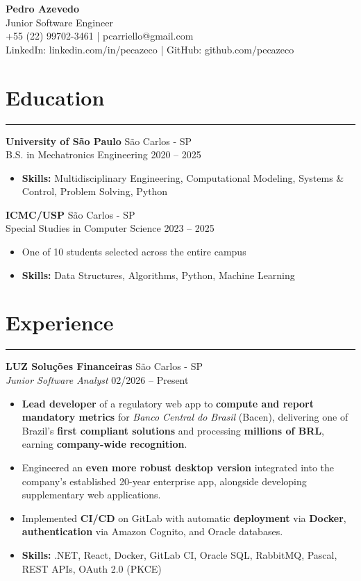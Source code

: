 \documentclass[10pt,a4paper]{article}
\begin{document}
\begin{center}
    {\huge \textbf{Pedro Azevedo}} \\
    Junior Software Engineer \\
    +55 (22) 99702-3461 \quad | \quad pcarriello@gmail.com \\
    LinkedIn: linkedin.com/in/pecazeco \quad | \quad GitHub: github.com/pecazeco
\end{center}

\section*{Education}
\hrule \vspace{2mm}
\textbf{University of São Paulo} \hfill São Carlos - SP \\
B.S. in Mechatronics Engineering \hfill 2020 -- 2025
\begin{itemize}[nosep]
    \item \textbf{Skills:} Multidisciplinary Engineering, Computational Modeling, Systems \& Control, Problem Solving, Python
\end{itemize}

\vspace{1mm}
\textbf{ICMC/USP} \hfill São Carlos - SP \\
Special Studies in Computer Science \hfill 2023 -- 2025
\begin{itemize}[nosep]
    \item One of 10 students selected across the entire campus
    \item \textbf{Skills:} Data Structures, Algorithms, Python, Machine Learning
\end{itemize}

\section*{Experience}
\hrule \vspace{2mm}
\textbf{LUZ Soluções Financeiras} \hfill São Carlos - SP \\
\textit{Junior Software Analyst} \hfill 02/2026 -- Present
\begin{itemize}[nosep]
    \item \textbf{Lead developer} of a regulatory web app to \textbf{compute and report mandatory metrics} for \textit{Banco Central do Brasil} (Bacen), delivering one of Brazil's \textbf{first compliant solutions} and processing \textbf{millions of BRL}, earning \textbf{company-wide recognition}.
    \item Engineered an \textbf{even more robust desktop version} integrated into the company's established 20-year enterprise app, alongside developing supplementary web applications.
    \item Implemented \textbf{CI/CD} on GitLab with automatic \textbf{deployment} via \textbf{Docker}, \textbf{authentication} via Amazon Cognito, and Oracle databases.
    \item \textbf{Skills:} .NET, React, Docker, GitLab CI, Oracle SQL, RabbitMQ, Pascal, REST APIs, OAuth 2.0 (PKCE)
\end{itemize}
\end{document}
